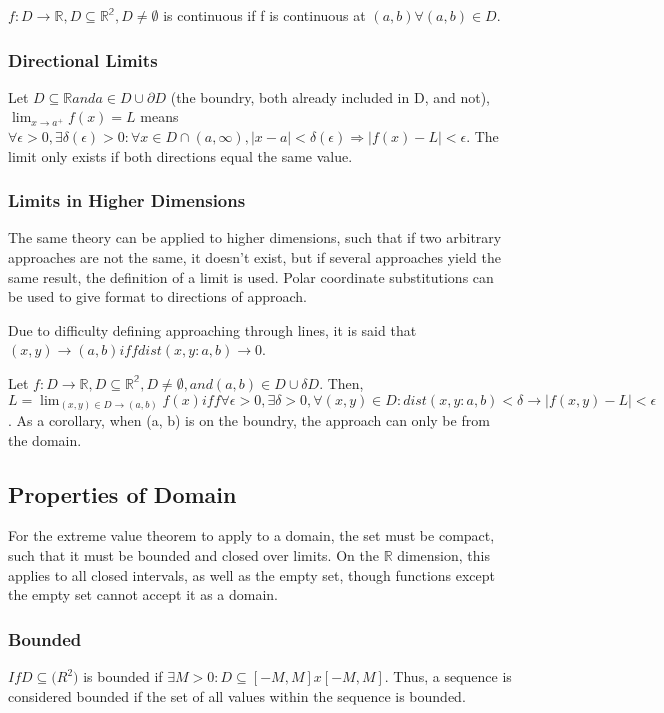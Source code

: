 \documentclass[11 pt, twoside]{article}
\begin{document}
$f:D \to \mathbb{R}, D \subseteq \mathbb{R^2}, D \neq \emptyset$ is continuous if f is continuous at $(a, b) \forall (a, b) \in D.$

\subsubsection{Directional Limits}
Let $D \subseteq \mathbb{R} and a \in D \cup \partial D$ (the boundry, both already included in D, and not), $\lim_{x \to a^+} f(x) = L$ means $\forall \epsilon > 0, \exists \delta(\epsilon) > 0: \forall x \in D \cap (a, \infty), |x-a| < \delta(\epsilon) \Rightarrow |f(x) - L| < \epsilon$. The limit only exists if both directions equal the same value.

\subsubsection{Limits in Higher Dimensions}
The same theory can be applied to higher dimensions, such that if two arbitrary approaches are not the same, it doesn't exist, but if several approaches yield the same result, the definition of a limit is used. Polar coordinate substitutions can be used to give format to directions of approach.

Due to difficulty defining approaching through lines, it is said that $(x, y) \to (a, b) iff dist(x, y: a, b) \to 0$.

Let $f: D \to \mathbb{R}, D \subseteq \mathbb{R^2}, D \neq \emptyset, and (a, b) \in D \cup \delta D.$ Then, $L = \lim_{(x, y) \in D \to (a,b)} f(x) iff \forall \epsilon > 0, \exists \delta > 0, \forall (x, y) \in D: dist(x, y: a, b) < \delta \to |f(x, y) - L| < \epsilon$. As a corollary, when (a, b) is on the boundry, the approach can only be from the domain.

\subsection{Properties of Domain}
For the extreme value theorem to apply to a domain, the set must be compact, such that it must be bounded and closed over limits. On the $\mathbb{R}$ dimension, this applies to all closed intervals, as well as the empty set, though functions except the empty set cannot accept it as a domain.

\subsubsection{Bounded}
$If D \subseteq \mathbb(R^2)$ is bounded if $\exists M > 0: D \subseteq [-M, M] x [-M, M]$. Thus, a sequence is considered bounded if the set of all values within the sequence is bounded.
\end{document}
